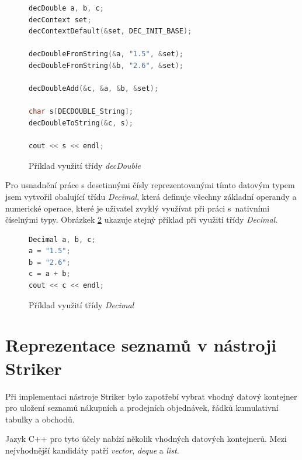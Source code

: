 \documentclass[thesis=M,czech]{FITthesis}[2012/06/26]
\begin{document}
\begin{figure}\centering
	\begin{lstlisting}[language=C++, basicstyle={\scriptsize\ttfamily}, frame=single] 
decDouble a, b, c;
decContext set;
decContextDefault(&set, DEC_INIT_BASE);

decDoubleFromString(&a, "1.5", &set);
decDoubleFromString(&b, "2.6", &set);

decDoubleAdd(&c, &a, &b, &set);

char s[DECDOUBLE_String];
decDoubleToString(&c, s);

cout << s << endl;
	\end{lstlisting}
	\caption[Příklad využití třídy \textit{decDouble}]{Příklad využití třídy \textit{decDouble}}\label{fig:impl-decdouble}
\end{figure}

Pro usnadnění práce s desetinnými čísly reprezentovanými tímto datovým typem jsem vytvořil obalující třídu \textit{Decimal}, 
která definuje všechny základní operandy a numerické operace, které je uživatel zvyklý využívat při práci s~nativními číselnými 
typy. Obrázkek \ref{fig:impl-decimal} ukazuje stejný příklad při využití třídy \textit{Decimal}.

\begin{figure}\centering
	\begin{lstlisting}[language=C++, basicstyle={\scriptsize\ttfamily}, frame=single] 
Decimal a, b, c;
a = "1.5";
b = "2.6";
c = a + b;
cout << c << endl;
	\end{lstlisting}
	\caption[Příklad využití třídy \textit{Decimal}]{Příklad využití třídy \textit{Decimal}}\label{fig:impl-decimal}
\end{figure}




\section{Reprezentace seznamů v nástroji Striker}

Při implementaci nástroje Striker bylo zapotřebí vybrat vhodný datový kontejner pro uložení seznamů nákupních a prodejních 
objednávek, řádků kumulativní tabulky a obchodů.

Jazyk C++ pro tyto účely nabízí několik vhodných datových kontejnerů. Mezi nejvhodnější kandidáty patří \textit{vector}, 
\textit{deque} a \textit{list}. 

\end{document}
